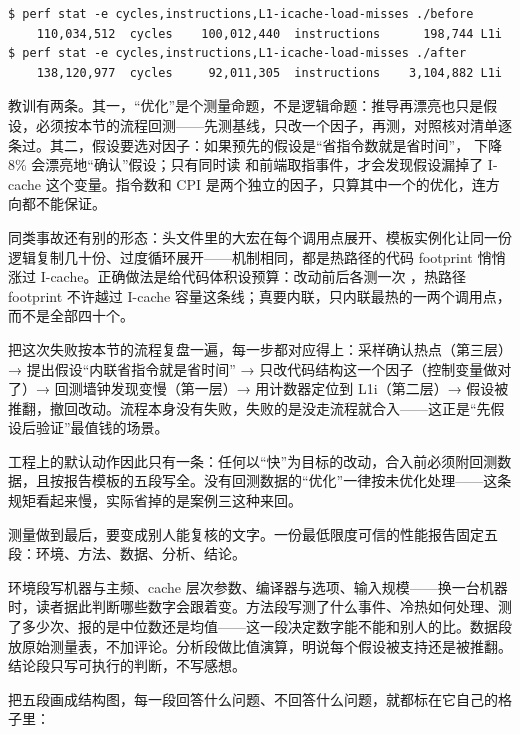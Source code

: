 \begin{lstlisting}
$ perf stat -e cycles,instructions,L1-icache-load-misses ./before
    110,034,512  cycles    100,012,440  instructions      198,744 L1i
$ perf stat -e cycles,instructions,L1-icache-load-misses ./after
    138,120,977  cycles     92,011,305  instructions    3,104,882 L1i
\end{lstlisting}

教训有两条。其一，“优化”是个测量命题，不是逻辑命题：推导再漂亮也只是假设，必须按本节的流程回测——先测基线，只改一个因子，再测，对照核对清单逐条过。其二，假设要选对因子：如果预先的假设是“省指令数就是省时间”， 下降 8\% 会漂亮地“确认”假设；只有同时读  和前端取指事件，才会发现假设漏掉了 I-cache 这个变量。指令数和 CPI 是两个独立的因子，只算其中一个的优化，连方向都不能保证。

同类事故还有别的形态：头文件里的大宏在每个调用点展开、模板实例化让同一份逻辑复制几十份、过度循环展开——机制相同，都是热路径的代码 footprint 悄悄涨过 I-cache。正确做法是给代码体积设预算：改动前后各测一次 ，热路径 footprint 不许越过 I-cache 容量这条线；真要内联，只内联最热的一两个调用点，而不是全部四十个。

把这次失败按本节的流程复盘一遍，每一步都对应得上：采样确认热点（第三层）→ 提出假设“内联省指令就是省时间” → 只改代码结构这一个因子（控制变量做对了）→ 回测墙钟发现变慢（第一层）→ 用计数器定位到 L1i（第二层）→ 假设被推翻，撤回改动。流程本身没有失败，失败的是没走流程就合入——这正是“先假设后验证”最值钱的场景。

工程上的默认动作因此只有一条：任何以“快”为目标的改动，合入前必须附回测数据，且按报告模板的五段写全。没有回测数据的“优化”一律按未优化处理——这条规矩看起来慢，实际省掉的是案例三这种来回。

测量做到最后，要变成别人能复核的文字。一份最低限度可信的性能报告固定五段：环境、方法、数据、分析、结论。

环境段写机器与主频、cache 层次参数、编译器与选项、输入规模——换一台机器时，读者据此判断哪些数字会跟着变。方法段写测了什么事件、冷热如何处理、测了多少次、报的是中位数还是均值——这一段决定数字能不能和别人的比。数据段放原始测量表，不加评论。分析段做比值演算，明说每个假设被支持还是被推翻。结论段只写可执行的判断，不写感想。

把五段画成结构图，每一段回答什么问题、不回答什么问题，就都标在它自己的格子里：

